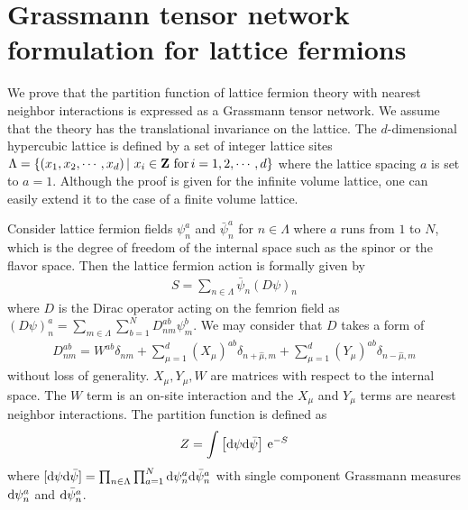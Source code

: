 \section{Grassmann tensor network formulation for lattice fermions}
\label{sec:TN}

We prove that the partition function of lattice fermion theory 
with nearest neighbor interactions is expressed 
as a Grassmann tensor network.  We assume that the theory 
has the translational invariance on the lattice.
%
The $d$-dimensional hypercubic lattice is defined by a set of integer lattice sites 
$\Lambda  =\{(x_1,x_2,\cdots, x_d) \, | \ x_i \in \mathbf{Z} \ {\rm for} \, i=1,2,\cdots,d \}$ 
where the lattice spacing $a$ is set to $a=1$. Although the proof is given for the infinite volume lattice,
one can easily extend it to the case of a finite volume lattice.

Consider lattice  fermion fields $\psi^a_n$ and $\bar\psi^a_n$ for $n \in \Lambda$ 
where  $a$ runs from $1$ to $N$, which is the degree of freedom of the internal space 
such as the spinor or the flavor space. Then the lattice fermion action is formally given by
\begin{align}
S= \sum_{n\in \Lambda} \bar\psi_n (D \psi)_n 
\end{align}
where $D$ is the Dirac operator acting on the femrion field as 
$ (D \psi)_n^a = \sum_{m \in \Lambda} \sum_{b=1}^N D^{ab}_{nm} \psi_m^b$. 
We may consider that $D$ takes a form of 
\begin{align}
D^{ab}_{nm} = W^{ab} \delta_{nm} + \sum_{\mu=1}^d 
(X_\mu)^{ab} \delta_{n+\hat \mu ,m} + \sum_{\mu=1}^d  (Y_\mu)^{ab} \delta_{n-\hat \mu ,m} 
\end{align}
without loss of generality. $X_\mu,Y_\mu,W$ are matrices with respect to the internal space. 
The $W$ term is an on-site interaction and the $X_\mu$ and $Y_\mu$ terms are nearest neighbor interactions. 
The partition function is defined as
\begin{align}
Z= \int \left[\mathrm{d}\psi \mathrm{d}\bar\psi\right] \, \mathrm{e}^{-S} 
\end{align}
where $[\mathrm{d}\psi \mathrm{d}\bar\psi] = \prod_{n \in \Lambda}  \prod_{a=1}^N \mathrm{d}\psi_n^a \mathrm{d} \bar\psi_n^a$ 
with single component Grassmann measures  $\mathrm{d} \psi_n^a$ and $\mathrm{d} \bar\psi_n^a$. 


